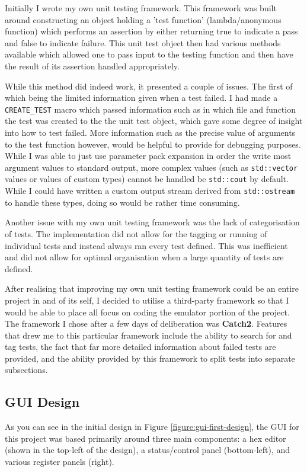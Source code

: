     Initially I wrote my own unit testing framework. This framework was built around constructing an object holding a 'test function' (lambda/anonymous function) which performs an assertion by either returning true to indicate a pass and false to indicate failure. This unit test object then had various methods available which allowed one to pass input to the testing function and then have the result of its assertion handled appropriately.

    While this method did indeed work, it presented a couple of issues. The first of which being the limited information given when a test failed. I had made a \texttt{CREATE\_TEST} macro which passed information such as in which file and function the test was created to the the unit test object, which gave some degree of insight into how to test failed. More information such as the precise value of arguments to the test function however, would be helpful to provide for debugging purposes. While I was able to just use parameter pack expansion in order the write most argument values to standard output, more complex values (such as \texttt{std::vector} values or values of custom types) cannot be handled be \texttt{std::cout} by default. While I could have written a custom output stream derived from \texttt{std::ostream} to handle these types, doing so would be rather time consuming.

    Another issue with my own unit testing framework was the lack of categorisation of tests. The implementation did not allow for the tagging or running of individual tests and instead always ran every test defined. This was inefficient and did not allow for optimal organisation when a large quantity of tests are defined.

    After realising that improving my own unit testing framework could be an entire project in and of its self, I decided to utilise a third-party framework so that I would be able to place all focus on coding the emulator portion of the project. The framework I chose after a few days of deliberation was \textbf{Catch2}. Features that drew me to this particular framework include the ability to search for and tag tests, the fact that far more detailed information about failed tests are provided, and the ability provided by this framework to split tests into separate subsections.

\subsection{GUI Design}
    \label{sec:gui-design}
    As you can see in the initial design in Figure \ref{figure:gui-first-design}, the GUI for this project was based primarily around three main components: a hex editor (shown in the top-left of the design), a status/control panel (bottom-left), and various register panels (right).

